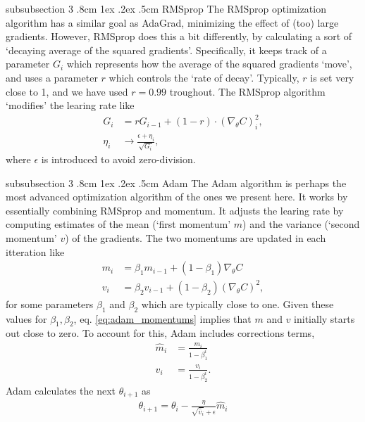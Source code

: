 \documentclass[%
reprint,s
amsmath,amssymb,
aps,
]{revtex4-2}
\makeatletter
\renewcommand{\subsubsection}{%
	\@startsection
	{subsubsection}%
	{3}%
	{\z@}%
	{.8cm \@plus1ex \@minus .2ex}%
	{.5cm}%
	{\normalfont\small\centering}%
}
\makeatother
\begin{document}
\subsubsection{RMSprop}
The RMSprop optimization algorithm has a similar goal as AdaGrad, minimizing the effect of (too) large gradients. However, RMSprop does this a bit differently, by calculating a sort of `decaying average of the squared gradients'. Specifically, it keeps track of a parameter \(G_i\) which represents how the average of the squared gradients `move', and uses a parameter \( r \) which controls the `rate of decay'. Typically, \( r\) is set very close to 1, and we have used \(r=0.99\) troughout. The RMSprop algorithm `modifies' the learing rate like 
\begin{align}
	G_i &= r G_{i-1} + (1 - r) \cdot (\nabla_{\theta}C)_{i}^{2}, \\
	\eta_i &\rightarrow \frac{\epsilon + \eta_i}{\sqrt{G_i}},
\end{align}
where \(\epsilon\) is introduced to avoid zero-division.

\subsubsection{Adam}
The Adam algorithm is perhaps the most advanced optimization algorithm of the ones we present here. It works by essentially combining RMSprop and momentum. It adjusts the learing rate by computing estimates of the mean (`first momentum' \(m\)) and the variance (`second momentum' \(v\)) of the gradients. The two momentums are updated in each itteration like
\begin{align}	\label{eq:adam_momentums}
	m_i &= \beta_1 m_{i-1} + (1 - \beta_1) \nabla_{\theta} C \\
    v_i &= \beta_2 v_{i-1} + (1 - \beta_2) (\nabla_{\theta} C)^2,
\end{align}
for some parameters \(\beta_1\) and \(\beta_2\) which are typically close to one. Given these values for \(\beta_1, \beta_2\), eq. \eqref{eq:adam_momentums} implies that \(m\) and \(v\) initially starts out close to zero. To account for this, Adam includes corrections terms,
\begin{align}
	\hat{m}_i &= \frac{m_i}{1 - \beta_1^i} \\
    \hat{v}_i &= \frac{v_i}{1 - \beta_2^i}.
\end{align}
Adam calculates the next \(\theta_{i+1}\) as 
\begin{align}
	\theta_{i+1} = \theta_{i} - \frac{\eta}{\sqrt{\hat{v}_i} + \epsilon} \hat{m}_i
\end{align}
\end{document}
